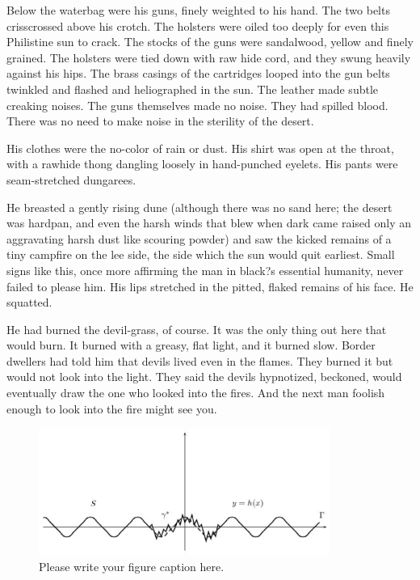 \documentclass[
11pt,%
tightenlines,%
twoside,%
onecolumn,%
nofloats,%
nobibnotes,%
nofootinbib,%
superscriptaddress,%
noshowpacs,%
centertags]%
{revtex4}
\begin{document}
Below the waterbag were his guns, finely weighted to his hand. The two belts crisscrossed above his crotch. The holsters were oiled too deeply for even this Philistine sun to crack. The stocks of the guns were sandalwood, yellow and finely grained. The holsters were tied down with raw hide cord, and they swung heavily against his hips. The brass casings of the cartridges looped into the gun belts twinkled and flashed and heliographed in the sun. The leather made subtle creaking noises. The guns themselves made no noise. They had spilled blood. There was no need to make noise in the sterility of the desert.

His clothes were the no-color of rain or dust. His shirt was open at the throat, with a rawhide thong dangling loosely in hand-punched eyelets. His pants were seam-stretched dungarees.

He breasted a gently rising dune (although there was no sand here; the desert was hardpan, and even the harsh winds that blew when dark came raised only an aggravating harsh dust like scouring powder) and saw the kicked remains of a tiny campfire on the lee side, the side which the sun would quit earliest. Small signs like this, once more affirming the man in black?s essential humanity, never failed to please him. His lips stretched in the pitted, flaked remains of his face. He squatted.

He had burned the devil-grass, of course. It was the only thing out here that would burn. It burned with a greasy, flat light, and it burned slow. Border dwellers had told him that devils lived even in the flames. They burned it but would not look into the light. They said the devils hypnotized, beckoned, would eventually draw the one who looked into the fires. And the next man foolish enough to look into the fire might see you.

\begin{figure}[h]
\setcaptionmargin{5mm}
\onelinecaptionstrue  %
\includegraphics[width=0.85\textwidth]{deform.eps}
\caption{Please write your figure caption here.}\label{fig:1}
\end{figure}
\end{document}
